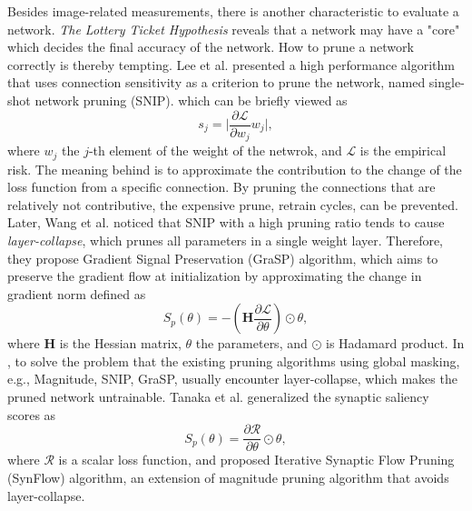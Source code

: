 \documentclass[sigconf]{acmart}
\begin{document}
    Besides image-related measurements, there is another characteristic to evaluate a network. 
    \textit{The Lottery Ticket Hypothesis} \cite{frankle2019lottery} reveals that a 
    network may have a "core" which decides the final accuracy of the network. 
    How to prune a network correctly is thereby tempting. Lee et al. 
    \cite{lee2019snip} presented a high performance algorithm that uses connection 
    sensitivity as a criterion to prune the network, named single-shot network pruning (SNIP). 
    which can be briefly viewed as 
    \begin{equation}
        \label{equ:snip_connection_sensitivity}
        s_j=\lvert \frac{\partial \mathcal L}{\partial w_j}w_j\rvert,
    \end{equation}
    where $w_j$ the $j$-th element of the weight of the netwrok, and $\mathcal L$ is 
    the empirical risk. The meaning behind is to approximate the contribution 
    to the change of the loss function from a specific connection. By pruning the 
    connections that are relatively not contributive, the expensive prune, retrain 
    cycles, can be prevented. 
    Later, Wang et al. \cite{wang2020picking} noticed that SNIP with a high pruning ratio 
    tends to cause \textit{layer-collapse}, which prunes all parameters in a single weight 
    layer. Therefore, they propose Gradient Signal Preservation (GraSP) algorithm, which 
    aims to preserve the gradient flow at initialization by approximating the change in 
    gradient norm defined as 
    \begin{equation}
        \label{equ:grap}
        S_p(\theta)=-(\textbf{H}\frac{\partial \mathcal L}{\partial \theta})\odot\theta,
    \end{equation}
    where $\textbf{H}$ is the Hessian matrix, $\theta$ the parameters, and $\odot$ is Hadamard product. 
    In \cite{tanaka2020pruning}, to solve the problem that the existing pruning algorithms using 
    global masking, e.g., Magnitude, SNIP, GraSP, usually encounter layer-collapse, which makes 
    the pruned network untrainable. 
    Tanaka et al. generalized the synaptic saliency scores as 
    \begin{equation}
        \label{equ:synflow}
        S_p(\theta)=\frac{\partial \mathcal R}{\partial \theta}\odot\theta,
    \end{equation}
    where $\mathcal R$ is a scalar loss function, and proposed Iterative Synaptic Flow Pruning (SynFlow) 
    algorithm, an extension of magnitude pruning algorithm that avoids layer-collapse. 
\end{document}
